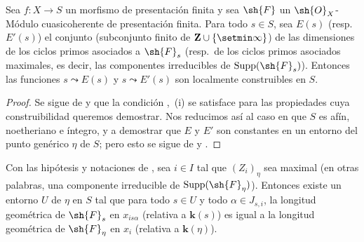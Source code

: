 \begin{proposition}[9.8.5]
\label{IV.9.8.5}
Sea $f:X\to S$ un morfismo de presentación finita y sea $\sh{F}$ un $\sh{O}_X$-Módulo cuasicoherente de presentación finita.
Para todo $s\in S$, sea $E(s)$ \textup{(resp.}~$E'(s)$\textup{)} el conjunto (subconjunto finito de $\mathbf{Z}\cup\{\setmin\infty\}$) de las dimensiones de los ciclos primos asociados a $\sh{F}_s$ \textup{(resp.}~de los ciclos primos asociados maximales, es decir, las componentes irreducibles de $\operatorname{Supp}(\sh{F}_s)$\textup{)}.
Entonces las funciones $s\leadsto E(s)$ y $s\leadsto E'(s)$ son localmente construibles en $S$.
\end{proposition}

\begin{proof}
\label{IV.9.8.5-proof}
Se sigue de  y  que la condición ,~(i) se satisface para las propiedades cuya construibilidad queremos demostrar.
Nos reducimos así al caso en que $S$ es afín, noetheriano e íntegro, y a demostrar que $E$ y $E'$ son constantes en un entorno del punto genérico $\eta$ de $S$; pero esto se sigue de  y .
\end{proof}

\begin{proposition}[9.8.6]
\label{IV.9.8.6}
Con las hipótesis y notaciones de \emph{}, sea $i\in I$ tal que $(Z_i)_\eta$ sea maximal (en otras palabras, una componente irreducible de $\operatorname{Supp}(\sh{F}_\eta)$).
Entonces existe un entorno $U$ de $\eta$ en $S$ tal que para todo $s\in U$ y todo $\alpha\in J_{s,i}$, la longitud geométrica de $\sh{F}_s$ en $x_{is\alpha}$ (relativa a $\mathbf{k}(s)$)  es igual a la longitud geométrica de $\sh{F}_\eta$ en $x_i$ (relativa a $\mathbf{k}(\eta)$).
\end{proposition}


